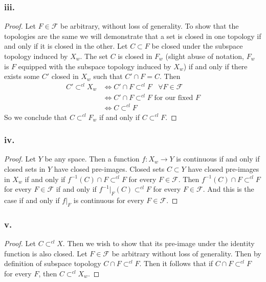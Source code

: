 \documentclass{article}
\theoremstyle{definition}
\begin{document}
    \subsubsection*{iii.}
    \begin{proof}
    Let $F \in \mathcal{F}$ be arbitrary, without loss of generality.
    To show that the topologies are the same we will demonstrate that a set is closed in one topology if and only if it is closed in the other. Let $C \subset F$ be closed under the subspace topology induced by $X_w$.
    The set $C$ is closed in $F_w$ (slight abuse of notation, $F_w$ is $F$ equipped with the subspace topology induced by $X_w$) if and only if there exists some $C'$ closed in $X_w$ such that $C' \cap F = C$. Then
    \begin{align*}
        C' \subset^{cl} X_w &\Leftrightarrow C' \cap F \subset^{cl} F \ \ \ \ \forall F \in \mathcal{F} \\
    &\Leftrightarrow C' \cap F \subset^{cl} F \text{ for our fixed $F$} \\
    &\Leftrightarrow C \subset^{cl} F
    \end{align*}
    So we conclude that $C \subset^{cl} F_w$ if and only if $C \subset^{cl} F$.
    \end{proof}
    \subsubsection*{iv.}
    \begin{proof}
    Let $Y$ be any space. Then a function $f:X_w \rightarrow Y$ is 
    continuous if and only if closed sets in $Y$ have closed pre-images.
    Closed sets $C \subset Y$ have closed pre-images in $X_w$ if and only if $f^{-1}(C) \cap F \subset^{cl} F$ for every $F \in \mathcal{F}$.
    Then $f^{-1}(C) \cap F \subset^{cl} F$ for every $F \in \mathcal{F}$ if and only if $f^{-1}\big|_F(C) \subset^{cl} F$ for every $F \in \mathcal{F}$. And this is the case if and only if $f\big|_F$ is continuous for every $F \in \mathcal{F}$.
    \end{proof}
    \subsubsection*{v.}
    \begin{proof}
    Let $C \subset^{cl} X$. Then we wish to show that its pre-image under 
    the identity function is also closed. Let $F \in \mathcal{F}$ be 
    arbitrary without loss of generality. Then by definition of subspace 
    topology $C \cap F \subset^{cl} F$.
    Then it follows that if $C \cap F \subset^{cl} F$ for every $F$,
    then $C \subset^{cl} X_w$.
    \end{proof}
\end{document}

